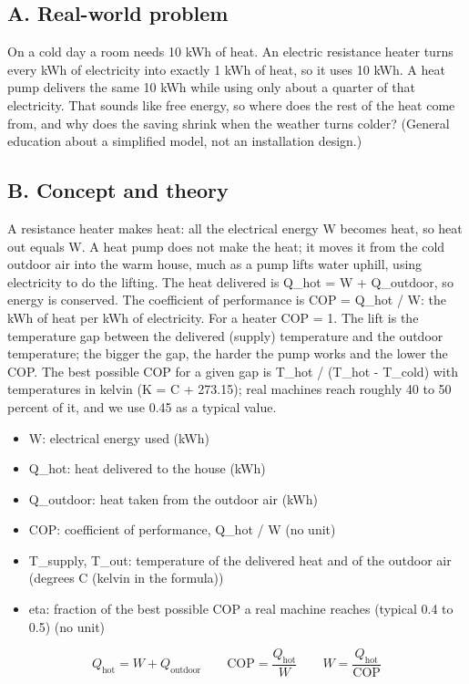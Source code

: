 \documentclass[11pt,a4paper]{article}
\begin{document}
\subsection*{A. Real-world problem}
On a cold day a room needs 10 kWh of heat. An electric resistance heater turns every kWh of electricity into exactly 1 kWh of heat, so it uses 10 kWh. A heat pump delivers the same 10 kWh while using only about a quarter of that electricity. That sounds like free energy, so where does the rest of the heat come from, and why does the saving shrink when the weather turns colder? (General education about a simplified model, not an installation design.)

\subsection*{B. Concept and theory}
A resistance heater makes heat: all the electrical energy W becomes heat, so heat out equals W. A heat pump does not make the heat; it moves it from the cold outdoor air into the warm house, much as a pump lifts water uphill, using electricity to do the lifting. The heat delivered is Q\_hot = W + Q\_outdoor, so energy is conserved. The coefficient of performance is COP = Q\_hot / W: the kWh of heat per kWh of electricity. For a heater COP = 1. The lift is the temperature gap between the delivered (supply) temperature and the outdoor temperature; the bigger the gap, the harder the pump works and the lower the COP. The best possible COP for a given gap is T\_hot / (T\_hot - T\_cold) with temperatures in kelvin (K = C + 273.15); real machines reach roughly 40 to 50 percent of it, and we use 0.45 as a typical value.

\begin{itemize}[nosep]
\item W: electrical energy used (kWh)
\item Q\_hot: heat delivered to the house (kWh)
\item Q\_outdoor: heat taken from the outdoor air (kWh)
\item COP: coefficient of performance, Q\_hot / W (no unit)
\item T\_supply, T\_out: temperature of the delivered heat and of the outdoor air (degrees C (kelvin in the formula))
\item eta: fraction of the best possible COP a real machine reaches (typical 0.4 to 0.5) (no unit)
\end{itemize}

\begin{equation*}
Q_{\text{hot}}=W+Q_{\text{outdoor}}\qquad \mathrm{COP}=\frac{Q_{\text{hot}}}{W}\qquad W=\frac{Q_{\text{hot}}}{\mathrm{COP}}
\end{equation*}
\end{document}
